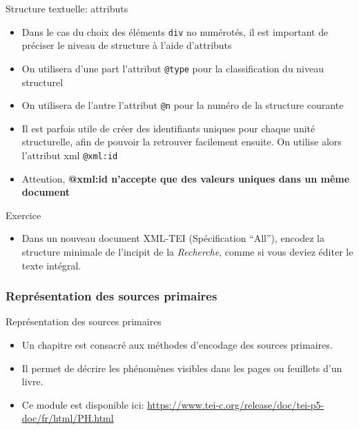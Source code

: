 \documentclass[11pt,aspectratio=1610]{beamer}
\begin{document}
\begin{frame}{Structure textuelle: attributs}
\begin{itemize}
\item Dans le cas du choix des éléments \texttt{div} no numérotés, il est important de préciser le niveau de structure à l'aide d'attributs
\item On utilisera d'une part l'attribut \texttt{@type} pour la classification du niveau structurel
\item On utilisera de l'autre l'attribut \texttt{@n} pour la numéro de la structure courante
\item Il est parfois utile de créer des identifiants uniques pour chaque unité structurelle, afin de pouvoir la retrouver facilement ensuite. On utilise alors l'attribut xml \texttt{@xml:id}
\item Attention, \textbf{@xml:id n'accepte que des valeurs uniques dans un même document}
\end{itemize}
\end{frame}

\begin{frame}{Exercice}
\begin{itemize}
\item Dans un nouveau document XML-TEI (Spécification \enquote{All}), encodez la structure minimale de l'incipit de la \textit{Recherche}, comme si vous deviez éditer le texte intégral.
\end{itemize}
\end{frame}

\subsubsection{Représentation des sources primaires}
\begin{frame}{Représentation des sources primaires}
\begin{itemize}
\item Un chapitre est consacré aux méthodes d'encodage des sources primaires. 
\item Il permet de décrire les phénomènes visibles dans les pages ou feuillets d'un livre.
\item Ce module est disponible ici: \href{https://www.tei-c.org/release/doc/tei-p5-doc/fr/html/PH.html}{https://www.tei-c.org/release/doc/tei-p5-doc/fr/html/PH.html}
\end{itemize}
\end{frame}
\end{document}
